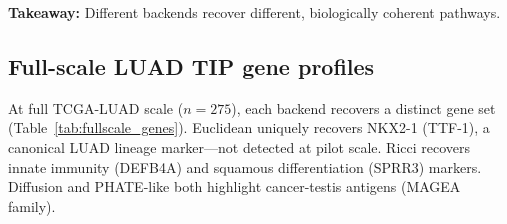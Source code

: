 \documentclass[12pt]{article}
\begin{document}
\textbf{Takeaway:} Different backends recover different, biologically coherent pathways.

\subsection{Full-scale LUAD TIP gene profiles}
\label{sec:fullscale_genes}

At full TCGA-LUAD scale ($n = 275$), each backend recovers a distinct gene set (Table~\ref{tab:fullscale_genes}).
Euclidean uniquely recovers NKX2-1 (TTF-1), a canonical LUAD lineage marker---not detected at pilot scale.
Ricci recovers innate immunity (DEFB4A) and squamous differentiation (SPRR3) markers.
Diffusion and PHATE-like both highlight cancer-testis antigens (MAGEA family).
\end{document}
